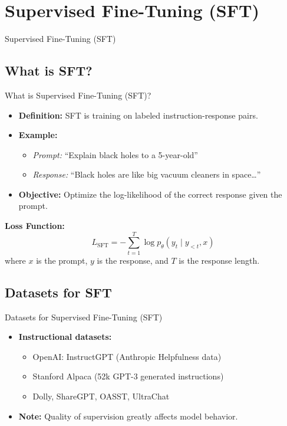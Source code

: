 \section{Supervised Fine-Tuning (SFT)}
\begin{frame}{}
    \LARGE Supervised Fine-Tuning (SFT)
\end{frame}


\subsection{What is SFT?}
\begin{frame}{What is Supervised Fine-Tuning (SFT)?}
    \begin{itemize}
        \item \textbf{Definition:} SFT is training on labeled instruction-response pairs.
        \item \textbf{Example:}
        \begin{itemize}
            \item \textit{Prompt:} ``Explain black holes to a 5-year-old''
            \item \textit{Response:} ``Black holes are like big vacuum cleaners in space\ldots''
        \end{itemize}
        \item \textbf{Objective:} Optimize the log-likelihood of the correct response given the prompt.
    \end{itemize}
    \vspace{0.5em}
    \textbf{Loss Function:}
    \[
        L_{\mathrm{SFT}} = -\sum_{t=1}^{T} \log p_{\theta}(y_t \mid y_{<t}, x)
    \]
    where $x$ is the prompt, $y$ is the response, and $T$ is the response length.
\end{frame}


\subsection{Datasets for SFT}
\begin{frame}{Datasets for Supervised Fine-Tuning (SFT)}
    \begin{itemize}
        \item \textbf{Instructional datasets:}
        \begin{itemize}
            \item OpenAI: InstructGPT (Anthropic Helpfulness data)
            \item Stanford Alpaca (52k GPT-3 generated instructions)
            \item Dolly, ShareGPT, OASST, UltraChat
        \end{itemize}
        \item \textbf{Note:} Quality of supervision greatly affects model behavior.
    \end{itemize}
\end{frame}


